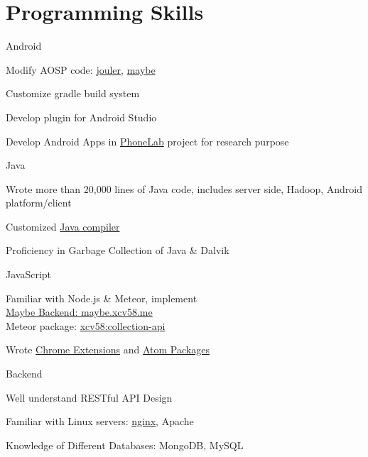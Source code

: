 

\section{Programming Skills}
\cvcomputer
{Android}{
\begin{tightitemize}
  \item Modify AOSP code:
  \href{http://platform.phone-lab.org:8080/gitweb?p=platform/frameworks/base.git;a=search;h=refs/heads/experiment/1/jouler;s=Yihong+Chen;st=author}{jouler},
  \href{http://platform.phone-lab.org:8080/gitweb?p=platform/frameworks/base.git;a=search;h=refs/heads/experiment/3/maybe;s=Yihong+Chen;st=author}{maybe}
  \item Customize gradle build system
  \item Develop plugin for Android Studio
  \item Develop Android Apps in
  \href{https://phone-lab.org/}{PhoneLab} project for research purpose
\end{tightitemize}
}
{Java}{
\begin{tightitemize}
  \item Wrote more than 20,000 lines of Java code, includes server side, Hadoop, Android platform/client
  \item Customized \href{https://github.com/blue-systems-group/project.maybe.polyglot}{Java compiler}
  \item Proficiency in Garbage Collection of Java \& Dalvik
\end{tightitemize}
}

\cvcomputer
{JavaScript}{
\begin{tightitemize}
  \item Familiar with Node.js \& Meteor, implement
  \\\href{http://maybe.cse.buffalo.edu}{Maybe Backend: maybe.xcv58.me}
  \\Meteor package:
  \href{https://atmospherejs.com/xcv58/collection-api}{xcv58:collection-api}
  \item Wrote \href{https://chrome.google.com/webstore/search/xcv58?hl=en}{Chrome Extensions} and
  \href{https://atom.io/users/xcv58}{Atom Packages}
\end{tightitemize}
}
{Backend}{
\begin{tightitemize}
  \item Well understand RESTful API Design
  \item Familiar with Linux servers:
  \href{https://github.com/xcv58/nginx-config}{nginx}, Apache
  \item Knowledge of Different Databases: MongoDB, MySQL
\end{tightitemize}
}

